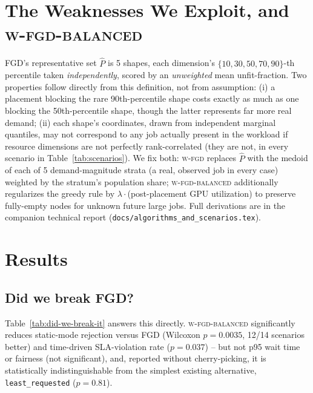 \documentclass[11pt]{article}
\begin{document}
\section{The Weaknesses We Exploit, and \textsc{w-fgd-balanced}}
\label{sec:fgd-weaknesses}
\label{sec:wfgd}
FGD's representative set $\hat P$ is 5 shapes, each dimension's
$\{10,30,50,70,90\}$-th percentile taken \emph{independently}, scored by
an \emph{unweighted} mean unfit-fraction. Two properties follow directly
from this definition, not from assumption: (i) a placement blocking the
rare 90th-percentile shape costs exactly as much as one blocking the
50th-percentile shape, though the latter represents far more real demand;
(ii) each shape's coordinates, drawn from independent marginal quantiles,
may not correspond to any job actually present in the workload if
resource dimensions are not perfectly rank-correlated (they are not, in
every scenario in Table~\ref{tab:scenarios}). We fix both: \textsc{w-fgd}
replaces $\hat P$ with the medoid of each of 5 demand-magnitude strata
(a real, observed job in every case) weighted by the stratum's population
share; \textsc{w-fgd-balanced} additionally regularizes the greedy rule
by $\lambda\cdot$(post-placement GPU utilization) to preserve fully-empty
nodes for unknown future large jobs. Full derivations are in the
companion technical report (\texttt{docs/algorithms\_and\_scenarios.tex}).

\section{Results}
\label{sec:results}

\subsection{Did we break FGD?}
Table~\ref{tab:did-we-break-it} answers this directly. \textsc{w-fgd-balanced}
significantly reduces static-mode rejection versus FGD (Wilcoxon
$p=0.0035$, 12/14 scenarios better) and time-driven SLA-violation rate
($p=0.037$) -- but not p95 wait time or fairness (not significant), and,
reported without cherry-picking, it is statistically indistinguishable
from the simplest existing alternative, \texttt{least\_requested}
($p=0.81$).
\end{document}
